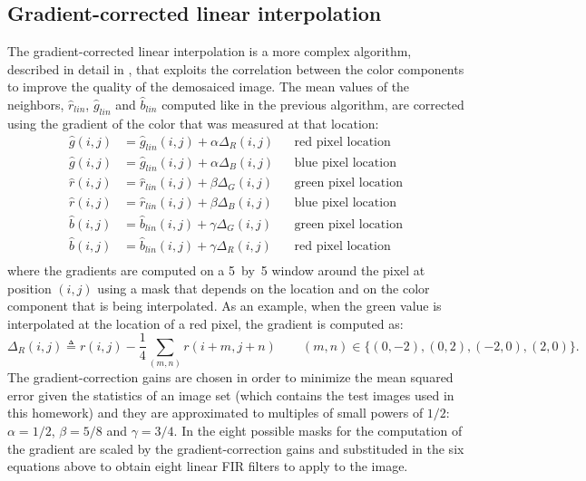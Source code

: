\documentclass[a4paper,oneside]{article}
\begin{document}
\subsection{Gradient-corrected linear interpolation}
The gradient-corrected linear interpolation is a more complex
algorithm, described in detail in \cite{demosaic_gradient}, that
exploits the correlation between the color components to improve the
quality of the demosaiced image.
%
The mean values of the neighbors, $\hat{r}_{lin}$, $\hat{g}_{lin}$ and
$\hat{b}_{lin}$ computed like in the previous algorithm, are corrected
using the gradient of the color that was measured at that location:
\begin{align*}
  \hat{g}(i,j) &= \hat{g}_{lin}(i,j) + \alpha \Delta_R(i,j) & & \text{red pixel location} \\
  \hat{g}(i,j) &= \hat{g}_{lin}(i,j) + \alpha \Delta_B(i,j) & & \text{blue pixel location} \\
  \hat{r}(i,j) &= \hat{r}_{lin}(i,j) + \beta \Delta_G(i,j) & & \text{green pixel location} \\
  \hat{r}(i,j) &= \hat{r}_{lin}(i,j) + \beta \Delta_B(i,j) & & \text{blue pixel location} \\
  \hat{b}(i,j) &= \hat{b}_{lin}(i,j) + \gamma \Delta_G(i,j) & & \text{green pixel location} \\
  \hat{b}(i,j) &= \hat{b}_{lin}(i,j) + \gamma \Delta_R(i,j) & & \text{red pixel location} \\
\end{align*}
where the gradients are computed on a 5~by~5 window around the pixel
at position $(i,j)$ using a mask that depends on the location and on
the color component that is being interpolated. As an example, when
the green value is interpolated at the location of a red pixel, the
gradient is computed as:
\begin{equation*}
  \Delta_R(i,j) \triangleq r(i,j) - \frac{1}{4} \sum_{(m,n)} r(i+m,j+n)
  \qquad (m,n) \in \{(0,-2), (0,2), (-2,0), (2,0)\} .
\end{equation*}
The gradient-correction gains are chosen in order to minimize the mean
squared error given the statistics of an image set (which contains the
test images used in this homework) and they are approximated to
multiples of small powers of $1/2$: $\alpha = 1/2$, $\beta = 5/8$ and
$\gamma = 3/4$. In \cite{demosaic_gradient} the eight possible masks
for the computation of the gradient are scaled by the
gradient-correction gains and substituded in the six equations above
to obtain eight linear FIR filters to apply to the image.
\end{document}
